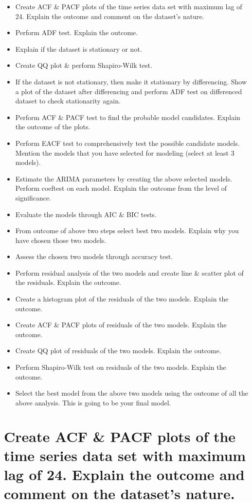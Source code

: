 \documentclass[
]{book}
\providecommand{\tightlist}{%
  \setlength{\itemsep}{0pt}\setlength{\parskip}{0pt}}
\begin{document}
\begin{itemize}
\tightlist
\item
  Create ACF \& PACF plots of the time series data set with maximum lag of 24. Explain the outcome and comment on the dataset's nature.
\item
  Perform ADF test. Explain the outcome.
\item
  Explain if the dataset is stationary or not.
\item
  Create QQ plot \& perform Shapiro-Wilk test.
\item
  If the dataset is not stationary, then make it stationary by differencing. Show a plot of the dataset after differencing and perform ADF test on differenced dataset to check stationarity again.
\item
  Perform ACF \& PACF test to find the probable model candidates. Explain the outcome of the plots.
\item
  Perform EACF test to comprehensively test the possible candidate models. Mention the models that you have selected for modeling (select at least 3 models).
\item
  Estimate the ARIMA parameters by creating the above selected models. Perform coeftest on each model. Explain the outcome from the level of significance.
\item
  Evaluate the models through AIC \& BIC tests.
\item
  From outcome of above two steps select best two models. Explain why you have chosen those two models.
\item
  Assess the chosen two models through accuracy test.
\item
  Perform residual analysis of the two models and create line \& scatter plot of the residuals. Explain the outcome.
\item
  Create a histogram plot of the residuals of the two models. Explain the outcome.
\item
  Create ACF \& PACF plots of residuals of the two models. Explain the outcome.
\item
  Create QQ plot of residuals of the two models. Explain the outcome.
\item
  Perform Shapiro-Wilk test on residuals of the two models. Explain the outcome.
\item
  Select the best model from the above two models using the outcome of all the above analysis. This is going to be your final model.
\end{itemize}

\section{Create ACF \& PACF plots of the time series data set with maximum lag of 24. Explain the outcome and comment on the dataset's nature.}\label{create-acf-pacf-plots-of-the-time-series-data-set-with-maximum-lag-of-24.-explain-the-outcome-and-comment-on-the-datasets-nature.}
\end{document}
